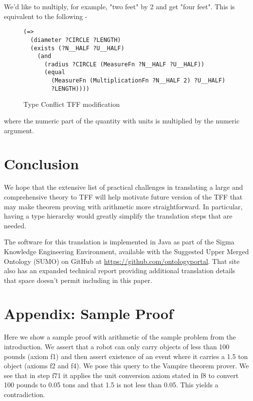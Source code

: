 \documentclass{article}
\begin{document}
We'd like to multiply, for example, "two feet" by 2 and get "four feet".  This
is equivalent to the following -

\begin{figure}[H]
\begin{framed}
\begin{verbatim}
(=> 
  (diameter ?CIRCLE ?LENGTH) 
  (exists (?N__HALF ?U__HALF) 
    (and 
      (radius ?CIRCLE (MeasureFn ?N__HALF ?U__HALF)) 
      (equal 
        (MeasureFn (MultiplicationFn ?N__HALF 2) ?U__HALF) 
        ?LENGTH))))
\end{verbatim}
\end{framed}
\caption{Type Conflict TFF modification}
\label{fig:TypeConflictTFFmod}
\end{figure}

where the numeric part of the quantity with units is multiplied by the numeric
argument.

\section{Conclusion}

We hope that the extensive list of practical challenges in translating a large
and comprehensive theory to TFF will help motivate future version of the TFF
that may make theorem proving with arithmetic more straightforward.  In particular,
having a type hierarchy would greatly simplify the translation steps that are
needed.  

\begin{sloppypar}
The software for this translation is implemented in Java as part of
the Sigma Knowledge Engineering Environment, available with the Suggested
Upper Merged Ontology (SUMO) on GitHub at \url{https://github.com/ontologyportal}.
That site also has an expanded technical report providing additional translation
details that space doesn't permit including in this paper.
\end{sloppypar}

\section{Appendix: Sample Proof}

Here we show a sample proof with arithmetic of the sample problem from the
introduction.  We assert that a robot can only carry objects of less than
100 pounds (axiom f1) and then assert existence of an event where it carries a 1.5
ton object (axioms f2 and f4).  We pose this query to the Vampire theorem prover.  We see that
in step f71 it applies the unit conversion axiom stated in f8 to convert
100 pounds to 0.05 tons and that 1.5 is not less than 0.05.  
This yields a contradiction.  
\end{document}
